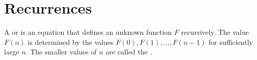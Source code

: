 


\chapter{Recurrences} %
\begin{Definition}
A  or  is an
equation that defines an unknown function $F$ recursively. 
The value $F(n)$ is determined by the values $F(0), F(1), \dots, F(n-1)$ for
sufficiently large $n$. The smaller values of $n$ are called the
. 
\end{Definition}

